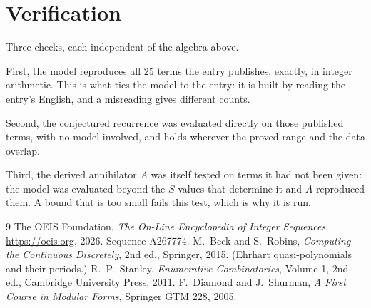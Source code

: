 \documentclass[11pt,a4paper]{article}
\theoremstyle{plain}
\theoremstyle{definition}
\begin{document}
\section{Verification}

Three checks, each independent of the algebra above.

First, the model reproduces all $25$ terms the entry publishes, exactly, in integer
arithmetic. This is what ties the model to the entry: it is built by reading the entry's
English, and a misreading gives different counts.

Second, the conjectured recurrence was evaluated directly on those published terms, with no
model involved, and holds wherever the proved range and the data overlap.

Third, the derived annihilator $A$ was itself tested on terms it had not been given: the model
was evaluated beyond the $S$ values that determine it and $A$ reproduced them. A bound that is
too small fails this test, which is why it is run.

\begin{thebibliography}{9}
 The OEIS Foundation, \emph{The On-Line Encyclopedia of Integer
Sequences}, \url{https://oeis.org}, 2026. Sequence A267774.
 M.~Beck and S.~Robins, \emph{Computing the Continuous Discretely},
2nd ed., Springer, 2015. (Ehrhart quasi-polynomials and their periods.)
 R.~P.~Stanley, \emph{Enumerative Combinatorics}, Volume 1, 2nd ed.,
Cambridge University Press, 2011.
 F.~Diamond and J.~Shurman, \emph{A First Course in Modular Forms},
Springer GTM 228, 2005.
\end{thebibliography}
\end{document}
